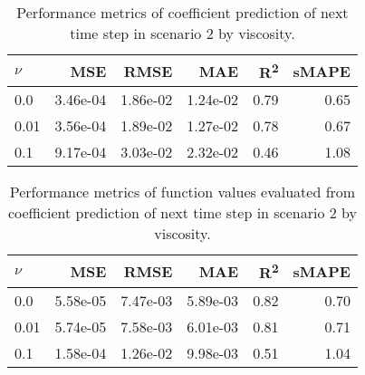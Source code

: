 \begin{table}[H]
  \caption{Performance metrics of coefficient prediction of next time step in scenario 2 by viscosity.}\label{table:scenario_2_spectral_metrics}
  \centering
  \begin{tabular}{lrrrrr}
    \toprule
    \(\nu \) & MSE      & RMSE     & MAE      & R\textsuperscript{2} & sMAPE \\
    \midrule
    0.0      & 3.46e-04 & 1.86e-02 & 1.24e-02 & 0.79                 & 0.65  \\
    0.01     & 3.56e-04 & 1.89e-02 & 1.27e-02 & 0.78                 & 0.67  \\
    0.1      & 9.17e-04 & 3.03e-02 & 2.32e-02 & 0.46                 & 1.08  \\
    \bottomrule
  \end{tabular}
\end{table}

\begin{table}[H]
  \caption{Performance metrics of function values evaluated from coefficient prediction of next time step in scenario 2 by viscosity.}\label{table:scenario_2_function_metrics}
  \centering
  \begin{tabular}{lrrrrr}
    \toprule
    \(\nu \) & MSE      & RMSE     & MAE      & R\textsuperscript{2} & sMAPE \\
    \midrule
    0.0      & 5.58e-05 & 7.47e-03 & 5.89e-03 & 0.82                 & 0.70  \\
    0.01     & 5.74e-05 & 7.58e-03 & 6.01e-03 & 0.81                 & 0.71  \\
    0.1      & 1.58e-04 & 1.26e-02 & 9.98e-03 & 0.51                 & 1.04  \\
    \bottomrule
  \end{tabular}
\end{table}

